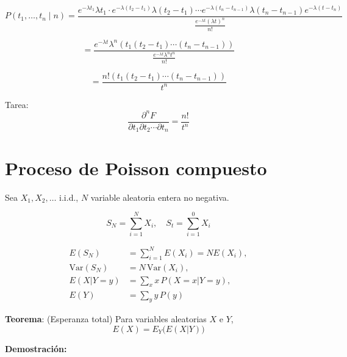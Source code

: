 \documentclass[12pt,a4paper]{article}
\newcommand{\teorema}[1]{%
\begin{teoremabox}
\textbf{Teorema}: #1
\end{teoremabox}
}
\begin{document}
\begin{equation*}
P(t_1, \ldots, t_n \mid n) = \frac{e^{-\lambda t_1} \lambda t_1 \cdot e^{-\lambda(t_2-t_1)} \lambda(t_2-t_1) \cdots e^{-\lambda(t_n-t_{n-1})} \lambda(t_n-t_{n-1}) e^{-\lambda(t-t_n)}}{\frac{e^{-\lambda t} (\lambda t)^n}{n!}}
\end{equation*}

\begin{equation*}
= \frac{e^{-\lambda t} \lambda^n (t_1(t_2-t_1)\cdots(t_n-t_{n-1}))}{\frac{e^{-\lambda t} \lambda^n t^n}{n!}}
\end{equation*}

\begin{equation*}
= \frac{n! (t_1(t_2-t_1)\cdots(t_n-t_{n-1}))}{t^n}
\end{equation*}

Tarea:
\begin{equation*}
\frac{\partial^n F}{\partial t_1 \partial t_2 \cdots \partial t_n} = \frac{n!}{t^n}
\end{equation*}





\section{Proceso de Poisson compuesto}

Sea $X_1, X_2, \ldots$ i.i.d., $N$ variable aleatoria entera no negativa.

\begin{equation*}
  S_N = \sum_{i=1}^{N} X_i, \quad S_t = \sum_{i=1}^{0} X_i
\end{equation*}

\begin{align*}
E(S_N) &= \sum_{i=1}^{N} E(X_i) = N E(X_i), \\
\mathrm{Var}(S_N) &= N\, \mathrm{Var}(X_i), \\
E(X|Y=y) &= \sum_{x} x\, P(X=x|Y=y), \\
E(Y) &= \sum_{y} y\, P(y)
\end{align*}


\teorema{(Esperanza total) Para variables aleatorias $X$ e $Y$,
\begin{equation*}
E(X) = E_Y\big(E(X|Y)\big)
\end{equation*}
}

\textbf{Demostración:}
\end{document}
